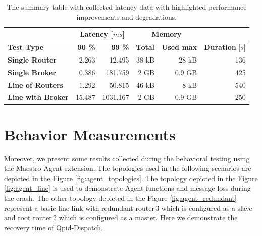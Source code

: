 \begingroup
\setlength{\tabcolsep}{10pt} %
\renewcommand{\arraystretch}{1.35} %
	\begin{table}[H]
	\centering
	\begin{tabular}{|l|r|r|r|r|r|}
	\hline
	\rowcolor[HTML]{C5E3DF}
	 & \multicolumn{2}{c|}{\textbf{Latency [$ms$]}} & \multicolumn{2}{c|}{\textbf{Memory}} &  \\ \hline
	\rowcolor[HTML]{C5E3DF}
	\textbf{Test Type} & \textbf{90 \%} & \textbf{99 \%} & \textbf{Total} & \textbf{Used max} & \textbf{Duration} [$s$] \\ \hline
	\textbf{Single Router} & 2.263 & 12.495 & 38 kB & 28 kB & \cellcolor[HTML]{9AFF99}136 \\ \hline
	\textbf{Single Broker} & 0.386 & 181.759 & 2 GB & 0.9 GB & \cellcolor[HTML]{FFCCC9}425 \\ \hline
	\textbf{Line of Routers} & \cellcolor[HTML]{9AFF99}1.292 & 50.815 & 46 kB & 8 kB & \cellcolor[HTML]{FFCCC9}540 \\ \hline
	\textbf{Line with Broker} & \cellcolor[HTML]{FFCCC9}15.487 & 1031.167 & 2 GB & 0.9 GB & \cellcolor[HTML]{9AFF99}250 \\ \hline
	\end{tabular}
	\caption{The summary table with collected latency data with highlighted performance improvements and degradations.}
	\label{tab:latency-summary}
	\end{table}
\endgroup


\section{Behavior Measurements}
\label{Behavior Measurements}
Moreover, we present some results collected during the behavioral testing using the Maestro Agent extension. The topologies used in the following scenarios are depicted in the Figure \ref{fig:agent_topologies}. The topology depicted in the Figure \ref{fig:agent_line} is used to demonstrate Agent functions and message loss during the crash. The other topology depicted in the Figure \ref{fig:agent_redundant} represent a basic line link with redundant router\,3 which is configured as a slave and root router\,2 which is configured as a master. Here we demonstrate the recovery time of Qpid-Dispatch.

